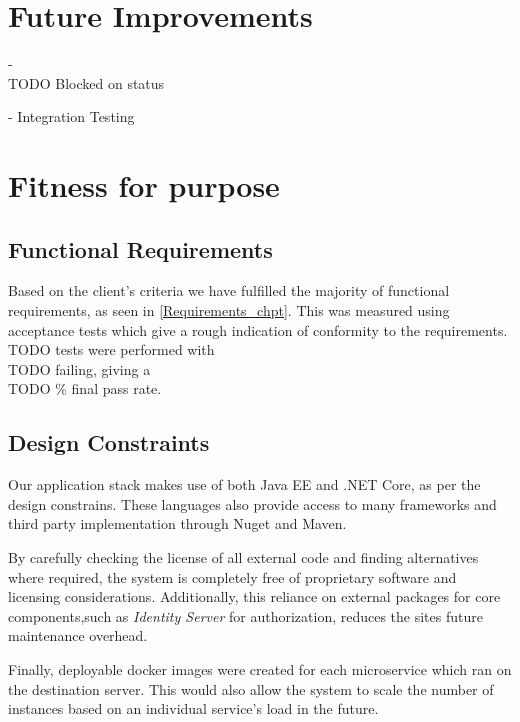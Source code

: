 \section{Future Improvements}

- \\TODO Blocked on status

- Integration Testing

\section{Fitness for purpose}
    \subsection{Functional Requirements}
    \par
    Based on the client's criteria we have fulfilled the majority of functional requirements, as seen in \ref{Requirements_chpt}. This was measured using acceptance tests which give a rough indication of conformity to the requirements. \\TODO tests were performed with \\TODO failing, giving a \\TODO \% final pass rate.

    \subsection{Design Constraints}
    \par
    Our application stack makes use of both Java EE and .NET Core, as per the design constrains. These languages also provide access to many frameworks and third party implementation through Nuget and Maven. 
    
    \par
    By carefully checking the license of all external code and finding alternatives where required, the system is completely free of proprietary software and licensing considerations. Additionally, this reliance on external packages for core components,such as \textit{Identity Server} for authorization, reduces the sites future maintenance overhead.

    Finally, deployable docker images were created for each microservice which ran on the destination server. This would also allow the system to scale the number of instances based on an individual service's load in the future.